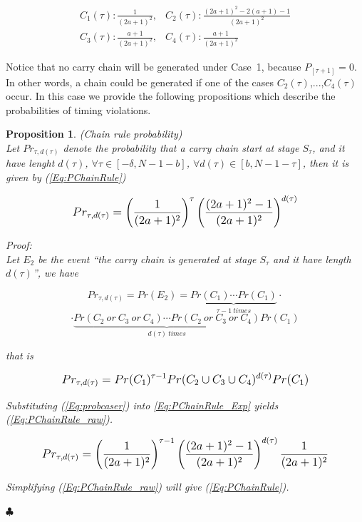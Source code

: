 \documentclass[journal]{IEEEtran}
\newtheorem{proposition}{Proposition}[section]
\begin{document}
\begin{equation}\label{Eq:probcaser}
\begin{array}{ll}
C_1(\tau): \frac{1}{(2a+1)^2}, &  C_2(\tau): \frac{(2a+1)^2-2(a+1)-1}{(2a+1)^2}\\
C_3(\tau):\frac{a+1}{(2a+1)^2}, & C_4(\tau):  \frac{a+1}{(2a+1)^2}
\end{array}
\end{equation}

Notice that no carry chain will be generated under Case~1, because $P_{[\tau+1]}=0$. In other words, a chain could be generated if one of  the cases $C_2(\tau)$,...,$C_4(\tau)$ occur. In this case we provide the following propositions which describe the probabilities of timing violations.


\begin{proposition} (Chain rule probability)\\
Let $Pr_{\tau,d(\tau )}$ denote the probability that a carry chain start at stage $S_{\tau}$, and it have lenght $d(\tau )$, $\forall \tau \in [-\delta , N-1-b]$, $\forall d(\tau) \in [b , N-1-\tau]$, then it is given by (\ref{Eq:PChainRule})

\begin{equation}\label{Eq:PChainRule}
\footnotesize
Pr_{\tau,d(\tau )} =\left(\frac{1}{(2a+1)^2}\right)^\tau \left(\frac{(2a+1)^2-1}{(2a+1)^2}\right)^{d(\tau )}
\normalsize
\end{equation}

\noindent Proof:\\

Let $E_2$ be the event ``the carry chain is generated at stage $S_{\tau}$ and it have length $d(\tau )$'', we have

\begin{equation}
Pr_{\tau,d(\tau )} = Pr(E_2)=  \underbrace{Pr(C_1)\cdots  Pr(C_1)}_{\tau -1 \ times}\cdot
\end{equation}
$$
\cdot  \underbrace{ Pr(C_2 \ or \ C_3   \ or \ C_4)\cdots Pr(C_2  \ or \   C_3   \ or \   C_4)}_{d(\tau) \  times}   Pr(C_1)$$

that is

\begin{equation}\label{Eq:PChainRule_Exp}
\scriptsize
Pr_{\tau,d(\tau )} = Pr(C_1)^{\tau -1} Pr(C_2 \cup C_3 \cup C_4)^{d(\tau )} Pr(C_1)
\normalsize
\end{equation}

Substituting (\ref{Eq:probcaser}) into \ref{Eq:PChainRule_Exp} yields (\ref{Eq:PChainRule_raw}).

\begin{equation}\label{Eq:PChainRule_raw}
\scriptsize
Pr_{\tau,d(\tau )}= \left(\frac{1}{(2a+1)^2}\right)^{\tau -1} \left(\frac{(2a+1)^2-1}{(2a+1)^2}\right)^{d(\tau )} \frac{1}{(2a+1)^2}
\normalsize
\end{equation}

Simplifying (\ref{Eq:PChainRule_raw}) will give (\ref{Eq:PChainRule}).

\hspace{7cm} $\clubsuit$
\vspace{1ex}

\end{proposition}
\end{document}
